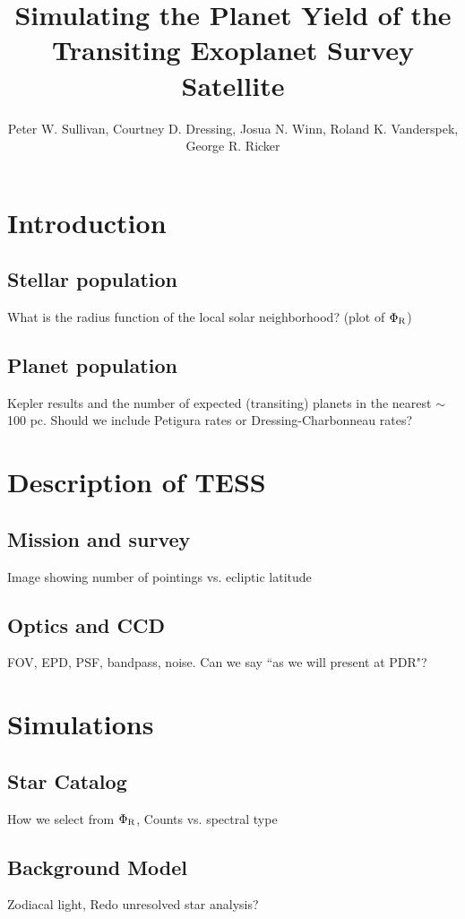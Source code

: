 \documentclass[preprint]{aastex}
\def \phir {\Phi_{\rm R}}
\begin{document}
\title{Simulating the Planet Yield of the Transiting Exoplanet Survey Satellite}

\author{Peter W. Sullivan, Courtney D. Dressing, Josua N. Winn, Roland K. Vanderspek, George R. Ricker}



\section{Introduction}
\subsection{Stellar population}
What is the radius function of the local solar neighborhood? (plot of $\phir$)
\subsection{Planet population}
Kepler results and the number of expected (transiting) planets in the nearest $\sim$100 pc. Should we include Petigura rates or Dressing-Charbonneau rates?

\section{Description of TESS}
\subsection{Mission and survey}
Image showing number of pointings vs. ecliptic latitude
\subsection{Optics and CCD}
FOV, EPD, PSF, bandpass, noise. 
Can we say ``as we will present at PDR"?

\section{Simulations}
\subsection{Star Catalog}
How we select from $\phir$, Counts vs. spectral type
\subsection{Background Model}
Zodiacal light, Redo unresolved star analysis?
\end{document}
